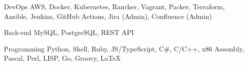 

\begin{cvskills}

  \cvskill
    {DevOps}
    {
      AWS,
      Docker,
      Kubernetes,
      Rancher,
      Vagrant,
      Packer,
      Terraform,
      Ansible,
      Jenkins,
      GitHub Actions,
      Jira (Admin),
      Confluence (Admin)
    }

  \cvskill
    {Back-end}
    {
      MySQL,
      PostgreSQL,
      REST API
    }

  \cvskill
    {Programming}
    {
      Python,
      Shell,
      Ruby,
      JS/TypeScript,
      C\#,
      C/C++,
      x86 Assembly,
      Pascal,
      Perl,
      LISP,
      Go,
      Groovy,
      LaTeX
    }

\end{cvskills}
